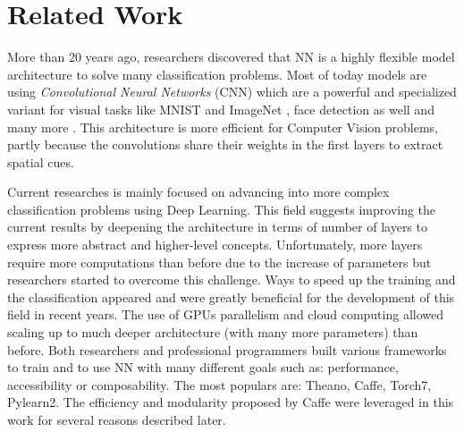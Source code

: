 \documentclass[a4paper,12pt]{report}
\begin{document}
\chapter{Related Work}
\label{chap:related}

More than 20 years ago, researchers discovered that NN is a highly flexible model architecture to solve many classification problems.
Most of today models are using {\em Convolutional Neural Networks} (CNN) which are a powerful and specialized variant for visual tasks like MNIST \cite{mnist_web} and ImageNet \cite{krizhevsky2012imagenet}, face detection as well \cite{rowley1998neural} and many more \cite{prechelt1994proben1}.
This architecture is more efficient for Computer Vision problems, partly because the convolutions share their weights in the first layers to extract spatial cues.

Current researches is mainly focused on advancing into more complex classification problems using Deep Learning.
This field suggests improving the current results by deepening the architecture in terms of number of layers to express more abstract and higher-level concepts.
Unfortunately, more layers require more computations than before due to the increase of parameters but researchers started to overcome this challenge.
Ways to speed up the training and the classification appeared and were greatly beneficial for the development of this field in recent years\cite{ciresan2011flexible}\cite{schmidhuber2015deep}\cite{nasse2009face}.
The use of GPUs parallelism and cloud computing allowed scaling up to much deeper architecture (with many more parameters) than before\cite{coates2013deep}.
Both researchers and professional programmers built various frameworks to train and to use NN with many different goals such as: performance, accessibility or composability.
The most populars are: Theano\cite{bastien2012theano}, Caffe\cite{jia2014caffe}, Torch7\cite{collobert2011torch7}, Pylearn2\cite{goodfellow2013pylearn2}.
The efficiency and modularity proposed by Caffe were leveraged in this work for several reasons described later.
\end{document}
